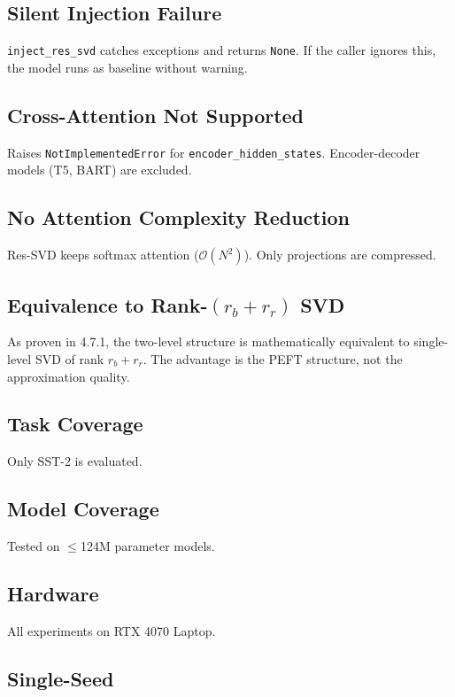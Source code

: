\subsection{Silent Injection Failure}

\texttt{inject\_res\_svd} catches exceptions and returns \texttt{None}. If the caller 
ignores this, the model runs as baseline without warning.

\subsection{Cross-Attention Not Supported}

Raises \texttt{NotImplementedError} for \texttt{encoder\_hidden\_states}. Encoder-decoder 
models (T5, BART) are excluded.

\subsection{No Attention Complexity Reduction}

Res-SVD keeps softmax attention ($\mathcal{O}(N^2)$). Only projections are 
compressed.

\subsection{Equivalence to Rank-$(r_b+r_r)$ SVD}

As proven in  4.7.1, the two-level structure is mathematically equivalent 
to single-level SVD of rank $r_b + r_r$. The advantage is the PEFT 
structure, not the approximation quality.

\subsection{Task Coverage}

Only SST-2 is evaluated.

\subsection{Model Coverage}

Tested on $\le$124M parameter models.

\subsection{Hardware}

All experiments on RTX 4070 Laptop.

\subsection{Single-Seed}

